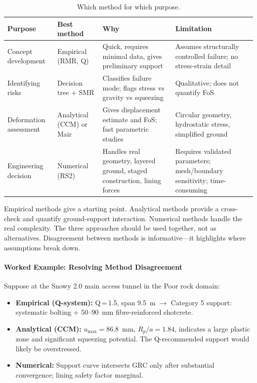 \begin{table}[h!]
\centering
\small
\begin{tabularx}{\textwidth}{l X X X}
\toprule
\textbf{Purpose} & \textbf{Best method} & \textbf{Why} & \textbf{Limitation} \\
\midrule
Concept development & Empirical (RMR, Q) & Quick, requires minimal data, gives preliminary support & Assumes structurally controlled failure; no stress-strain detail \\
Identifying risks & Decision tree + SMR & Classifies failure mode; flags stress vs gravity vs squeezing & Qualitative; does not quantify FoS \\
Deformation assessment & Analytical (CCM) or Mair & Gives displacement estimate and FoS; fast parametric studies & Circular geometry, hydrostatic stress, simplified ground \\
Engineering decision & Numerical (RS2) & Handles real geometry, layered ground, staged construction, lining forces & Requires validated parameters; mesh/boundary sensitivity; time-consuming \\
\bottomrule
\end{tabularx}
\caption{Which method for which purpose.}
\end{table}

\begin{notebox}
Empirical methods give a starting point. Analytical methods provide a cross-check and quantify ground-support interaction. Numerical methods handle the real complexity. The three approaches should be used together, not as alternatives. Disagreement between methods is informative---it highlights where assumptions break down.
\end{notebox}

\paragraph{Worked Example: Resolving Method Disagreement}

Suppose at the Snowy 2.0 main access tunnel in the Poor rock domain:
\begin{itemize}[nosep]
 \item \textbf{Empirical (Q-system):} Q\,=\,1.5, span 9.5~m $\to$ Category 5 support: systematic bolting + 50--90~mm fibre-reinforced shotcrete.
 \item \textbf{Analytical (CCM):} $u_{\max} = 86.8$~mm, $R_p/a = 1.84$, indicates a large plastic zone and significant squeezing potential. The Q-recommended support would likely be overstressed.
 \item \textbf{Numerical:} Support curve intersects GRC only after substantial convergence; lining safety factor marginal.
\end{itemize}

